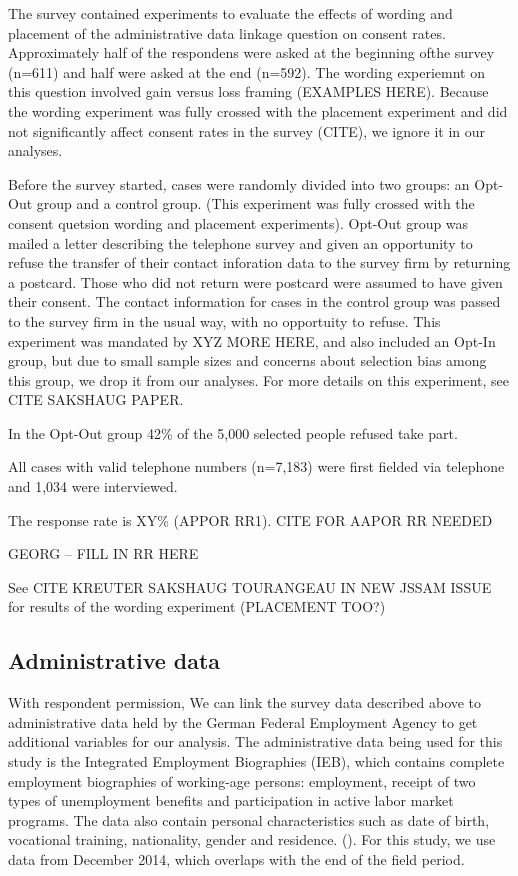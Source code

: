 The survey contained experiments to evaluate the effects of wording and placement of the administrative data linkage question on consent rates. Approximately half of the respondens were asked at the beginning ofthe survey (n=611) and half were asked at the end (n=592).
The wording experiemnt on this question involved gain versus loss framing (EXAMPLES HERE). Because the wording experiment was fully crossed with the placement experiment and did not significantly affect consent rates in the survey (CITE), we ignore it in our analyses.

Before the survey started, cases were randomly divided into two groups: an Opt-Out group and a control group. (This experiment was fully crossed with the consent quetsion wording and placement experiments). Opt-Out group was mailed a letter describing the telephone survey and given an opportunity to refuse the transfer of their contact inforation data to the survey firm by returning a postcard. Those who did not return were postcard were assumed to have given their consent. The contact information for cases in the control group was passed to the survey firm in the usual way, with no opportuity to refuse. This experiment was mandated by XYZ MORE HERE, and also included an Opt-In group, but due to small sample sizes and concerns about selection bias among this group, we drop it from our analyses. For more details on this experiment, see CITE SAKSHAUG PAPER. 

In the Opt-Out group 42\% of the 5,000 selected people refused take part. 

All cases with valid telephone numbers (n=7,183) were first fielded via telephone and 1,034 were interviewed. 

The response rate is XY\% (APPOR RR1). CITE FOR AAPOR RR NEEDED

GEORG -- FILL IN RR HERE

See CITE KREUTER SAKSHAUG TOURANGEAU IN NEW JSSAM ISSUE for results of the wording experiment (PLACEMENT TOO?)


\subsection{Administrative data}\label{admin}

With respondent permission, We can link the survey data described above to administrative data held by the German Federal Employment Agency to get additional variables for our analysis. The administrative data being used for this study is the Integrated Employment Biographies (IEB), which contains complete employment biographies of  working-age persons: employment, receipt of two types of unemployment benefits and participation in active labor market programs. The data also contain personal characteristics such as date of birth, vocational training, nationality, gender and residence. (\cite{Fitzenbergeretal05}). For this study, we use data from December 2014, which overlaps with the end of the field period.

